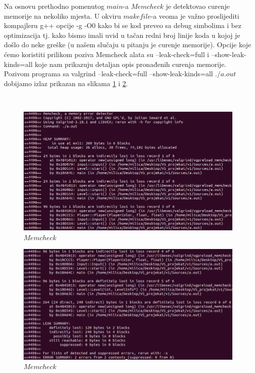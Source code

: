 \documentclass[a4paper]{article}
\begin{document}
Na osnovu prethodno pomenutog $main$-a $Memcheck$ je detektovao curenje memorije na nekoliko mjesta. U okviru $makefile$-a veoma je važno proslijediti kompajleru g++ opcije -g -O0 kako bi se kod preveo sa debug simbolima i bez optimizacija tj. kako bismo imali uvid u tačan redni broj linije koda u kojoj je došlo do neke greške (u našem slučaju u pitanju je curenje memorije). Opcije koje ćemo koristiti prilikom poziva Memcheck alata su --leak-check=full i --show-leak-kinds=all koje nam prikazuju detaljan opis pronađenih curenja memorije. Pozivom programa sa valgrind --leak-check=full --show-leak-kinds=all $./a.out$ dobijamo izlaz prikazan na slikama \ref{fig:mem1} i \ref{fig:mem2}.

\begin{verbatim}
	
\end{verbatim}

	\begin{figure}[h!]
		\caption{$Memcheck$}
		\label{fig:mem1}
		\includegraphics[scale=0.5]{mem1.png}
	\end{figure}
	\begin{figure}[h!]
		\caption{$Memcheck$}
		\label{fig:mem2}
		\includegraphics[scale=0.5]{mem2.png}
	\end{figure}
	
\end{document}
